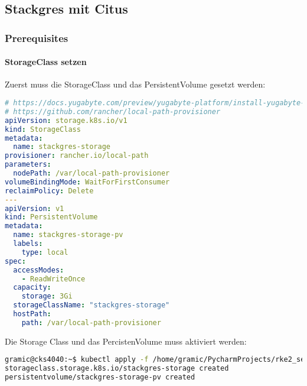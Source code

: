 
\subsection{Stackgres mit Citus}
\subsubsection{Prerequisites}
\paragraph{StorageClass setzen}
Zuerst muss die StorageClass und das PersistentVolume gesetzt werden:
\lstset{style=gra_codestyle}
\begin{lstlisting}[language=yaml, caption=StackGres-Citus - StorageClass setzen,captionpos=b,label={lst:stackgres-citus-storageclass-yaml},breaklines=true]
# https://docs.yugabyte.com/preview/yugabyte-platform/install-yugabyte-platform/prepare-environment/kubernetes/#configure-storage-class
# https://github.com/rancher/local-path-provisioner
apiVersion: storage.k8s.io/v1
kind: StorageClass
metadata:
  name: stackgres-storage
provisioner: rancher.io/local-path
parameters:
  nodePath: /var/local-path-provisioner
volumeBindingMode: WaitForFirstConsumer
reclaimPolicy: Delete
---
apiVersion: v1
kind: PersistentVolume
metadata:
  name: stackgres-storage-pv
  labels:
    type: local
spec:
  accessModes:
    - ReadWriteOnce
  capacity:
    storage: 3Gi
  storageClassName: "stackgres-storage"
  hostPath:
    path: /var/local-path-provisioner
\end{lstlisting}

Die Storage Class und das PercistenVolume muss aktiviert werden:
\lstset{style=gra_codestyle}
\begin{lstlisting}[language=bash, caption=yugabyteDB - StorageClass / PersistentVolume aktivieren,captionpos=b,label={lst:stackgres_citus-storageclass-apply},breaklines=true]
gramic@cks4040:~$ kubectl apply -f /home/gramic/PycharmProjects/rke2_settings/stackgres_citus/stackgres_citus/storageclass.yaml
storageclass.storage.k8s.io/stackgres-storage created
persistentvolume/stackgres-storage-pv created
\end{lstlisting}
